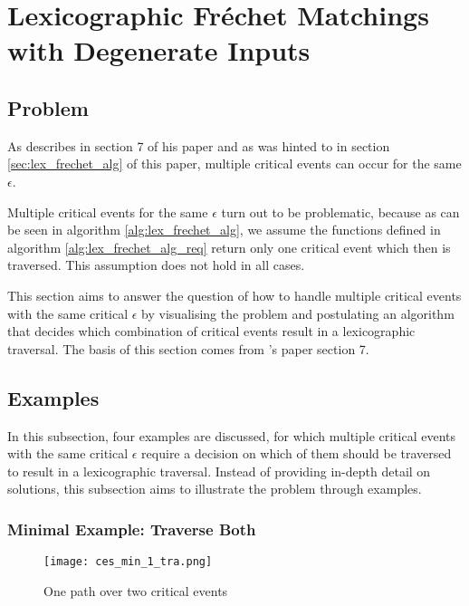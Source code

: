 
\section{Lexicographic Fréchet Matchings with Degenerate Inputs}\label{lex_frechet_deg}

\subsection{Problem}

As \citeauthor{rotelex} describes in section 7 of his paper  and as was hinted to in section \ref{sec:lex_frechet_alg} of this paper, multiple critical events can occur for the same $\epsilon$.

Multiple critical events for the same $\epsilon$ turn out to be problematic, because as can be seen in algorithm \ref{alg:lex_frechet_alg}, we assume the functions defined in algorithm \ref{alg:lex_frechet_alg_req} return only one critical event which then is traversed. This assumption does not hold in all cases.

This section aims to answer the question of how to handle multiple critical events with the same critical $\epsilon$ by visualising the problem and postulating an algorithm that decides which combination of critical events result in a lexicographic traversal. The basis of this section comes from \citeauthor{rotelex}'s paper section 7\cite{rotelex}.


\subsection{Examples}

In this subsection, four examples are discussed, for which multiple critical events with the same critical $\epsilon$ require a decision on which of them should be traversed to result in a lexicographic traversal. Instead of providing in-depth detail on solutions, this subsection aims to illustrate the problem through examples.


\subsubsection{Minimal Example: Traverse Both}\label{sec:ces_min_1}

\begin{figure}[H]
    \centering
    
    \texttt{[image: ces\_min\_1\_tra.png]}
		
	\caption{One path over two critical events}
    \label{fig:ces_min_1}
\end{figure}

